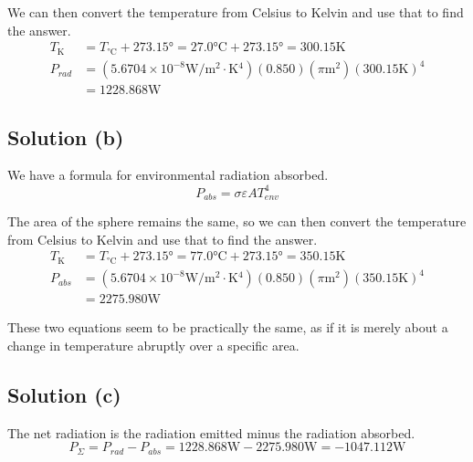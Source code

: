 \documentclass[12pt]{article}
\begin{document}
            We can then convert the temperature from Celsius to Kelvin and use that to find the answer.
            \begin{align}
                T_{\unit{\kelvin}}  &=  T_{\unit{\celsius}} + 273.15 \unit{\degree}
                    =   27.0 \unit{\celsius} + 273.15 \unit{\degree}
                    =   300.15\unit{\kelvin}\\
                P_{rad} &=  (5.6704 \times 10^{-8} \unit{\watt/\meter^2\cdot\kelvin^4}) (0.850) (\pi \unit{\meter^2}) (300.15 \unit{\kelvin})^4\\
                    &=  \boxed{1228.868 \unit{\watt}}
            \end{align}

        \subsection{Solution (b)}
            We have a formula for environmental radiation absorbed.
            \begin{equation}
                P_{abs} =   \sigma \varepsilon A T_{env}^4
            \end{equation}

            The area of the sphere remains the same, so we can then convert the temperature from Celsius to Kelvin and use that to find the answer.
            \begin{align}
                T_{\unit{\kelvin}}  &=  T_{\unit{\celsius}} + 273.15 \unit{\degree}
                    =   77.0 \unit{\celsius} + 273.15 \unit{\degree}
                    =   350.15\unit{\kelvin}\\
                P_{abs} &=  (5.6704 \times 10^{-8} \unit{\watt/\meter^2\cdot\kelvin^4}) (0.850) (\pi \unit{\meter^2}) (350.15 \unit{\kelvin})^4\\
                    &=  \boxed{2275.980 \unit{\watt}}
            \end{align}

            These two equations seem to be practically the same, as if it is merely about a change in temperature abruptly over a specific area.

        \subsection{Solution (c)}
            The net radiation is the radiation emitted minus the radiation absorbed.
            \begin{equation}
                P_\Sigma    =   P_{rad} - P_{abs}
                    =   1228.868 \unit{\watt} - 2275.980 \unit{\watt}
                    =   -1047.112 \unit{\watt}
            \end{equation}
\end{document}

